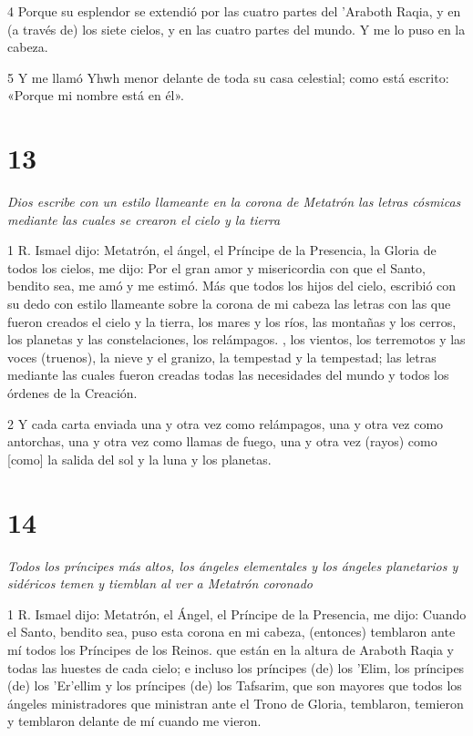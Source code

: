 \par 4 Porque su esplendor se extendió por las cuatro partes del 'Araboth Raqia, y en (a través de) los siete cielos, y en las cuatro partes del mundo. Y me lo puso en la cabeza.

\par 5 Y me llamó Yhwh menor delante de toda su casa celestial; como está escrito: «Porque mi nombre está en él».

\chapter{13}

\par \textit{Dios escribe con un estilo llameante en la corona de Metatrón las letras cósmicas mediante las cuales se crearon el cielo y la tierra}

\par 1 R. Ismael dijo: Metatrón, el ángel, el Príncipe de la Presencia, la Gloria de todos los cielos, me dijo: Por el gran amor y misericordia con que el Santo, bendito sea, me amó y me estimó. Más que todos los hijos del cielo, escribió con su dedo con estilo llameante sobre la corona de mi cabeza las letras con las que fueron creados el cielo y la tierra, los mares y los ríos, las montañas y los cerros, los planetas y las constelaciones, los relámpagos. , los vientos, los terremotos y las voces (truenos), la nieve y el granizo, la tempestad y la tempestad; las letras mediante las cuales fueron creadas todas las necesidades del mundo y todos los órdenes de la Creación.

\par 2 Y cada carta enviada una y otra vez como relámpagos, una y otra vez como antorchas, una y otra vez como llamas de fuego, una y otra vez (rayos) como [como] la salida del sol y la luna y los planetas.

\chapter{14}

\par \textit{Todos los príncipes más altos, los ángeles elementales y los ángeles planetarios y sidéricos temen y tiemblan al ver a Metatrón coronado}

\par 1 R. Ismael dijo: Metatrón, el Ángel, el Príncipe de la Presencia, me dijo: Cuando el Santo, bendito sea, puso esta corona en mi cabeza, (entonces) temblaron ante mí todos los Príncipes de los Reinos. que están en la altura de Araboth Raqia y todas las huestes de cada cielo; e incluso los príncipes (de) los 'Elim, los príncipes (de) los 'Er'ellim y los príncipes (de) los Tafsarim, que son mayores que todos los ángeles ministradores que ministran ante el Trono de Gloria, temblaron, temieron y temblaron delante de mí cuando me vieron.

